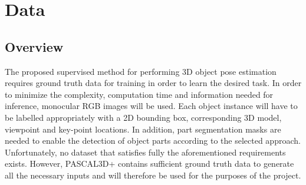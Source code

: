 \documentclass[main.tex]{subfiles}
\begin{document}
\section{Data}
\subsection{Overview}
The proposed supervised method for performing 3D object pose estimation requires ground truth data for training in order to learn the desired task. In order to minimize the complexity, computation time and information needed for inference, monocular RGB images will be used. Each object instance will have to be labelled appropriately with a 2D bounding box, corresponding 3D model, viewpoint and key-point locations. In addition, part segmentation masks are needed to enable the detection of object parts according to the selected approach. Unfortunately, no dataset that satisfies fully the aforementioned requirements exists. However, PASCAL3D+ \cite{Xiang2014} contains sufficient ground truth data to generate all the necessary inputs and will therefore be used for the purposes of the project.
\end{document}
